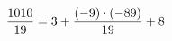 \documentclass[preview]{standalone}
\begin{document}
\begin{align*}
\special{dvisvgm:raw <g id='unique000'>}\frac{1010}{19} = 3 + \frac{(-9) \cdot (-89)}{19} + 8\special{dvisvgm:raw </g>}
\end{align*}
\end{document}
